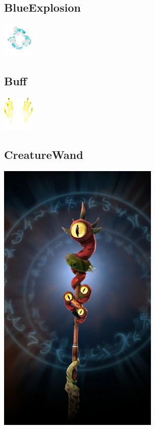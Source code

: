 \documentclass[a4paper,12pt]{scrartcl}
\begin{document}
	\subsection{BlueExplosion}
	\begin{center}\includegraphics{Prog2_EA_V2/Art/BlueExplosion.png}\end{center}
	\subsection{Buff}
	\begin{center}\includegraphics{Prog2_EA_V2/Art/Buff.png}\end{center}
	\subsection{CreatureWand}
	\begin{center}\includegraphics{Prog2_EA_V2/Art/CreatureWand.png}\end{center}
\end{document}
